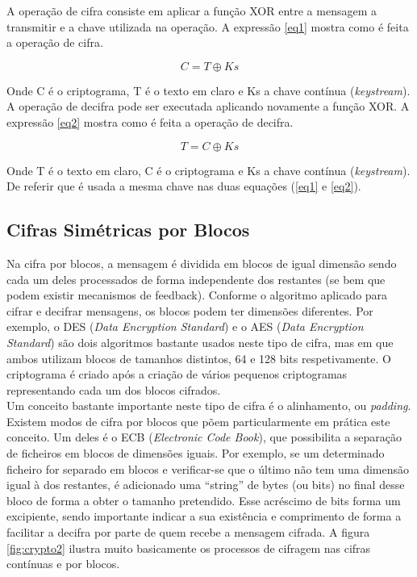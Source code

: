 \documentclass[a4paper,11pt,openright,oneside]{report}
\begin{document}
A operação de cifra consiste em aplicar a função XOR entre a mensagem a transmitir e a chave utilizada na operação. A expressão \ref{eq1} mostra como é feita a operação de cifra.

\begin{equation}
\label{eq1}
C = T \oplus Ks
\end{equation}

Onde C é o criptograma, T é o texto em claro e Ks a chave contínua (\textit{keystream}).\\

A operação de decifra pode ser executada aplicando novamente a função XOR. A expressão \ref{eq2} mostra como é feita a operação de decifra.

\begin{equation}
\label{eq2}
T = C \oplus Ks
\end{equation}

Onde T é o texto em claro, C é o criptograma e Ks a chave contínua (\textit{keystream}).\\

De referir que é usada a mesma chave nas duas equações (\ref{eq1} e \ref{eq2}).

\subsection{Cifras Simétricas por Blocos}

Na cifra por blocos, a mensagem é dividida em blocos de igual dimensão sendo cada um deles processados de forma independente dos restantes (se bem que podem existir mecanismos de feedback). Conforme o algoritmo aplicado para cifrar e decifrar mensagens, os blocos podem ter dimensões diferentes. Por exemplo, o DES (\textit{Data Encryption Standard}) e o AES (\textit{Data Encryption Standard}) são dois algoritmos bastante usados neste tipo de cifra, mas em que ambos utilizam blocos de tamanhos distintos, 64 e 128 bits respetivamente. O criptograma é criado após a criação de vários pequenos criptogramas representando cada um dos blocos cifrados.\\

Um conceito bastante importante neste tipo de cifra é o alinhamento, ou \textit{padding}. Existem modos de cifra por blocos que põem particularmente em prática este conceito. Um deles é o ECB (\textit{Electronic Code Book}), que possibilita a separação de ficheiros em blocos de dimensões iguais. Por exemplo, se um determinado ficheiro for separado em blocos e verificar-se que o último não tem uma dimensão igual à dos restantes, é adicionado uma “string” de bytes (ou bits) no final desse bloco de forma a obter o tamanho pretendido. Esse acréscimo de bits forma um excipiente, sendo importante indicar a sua existência e comprimento de forma a facilitar a decifra por parte de quem recebe a mensagem cifrada. A figura \ref{fig:crypto2} ilustra muito basicamente os processos de cifragem nas cifras contínuas e por blocos.
\end{document}
